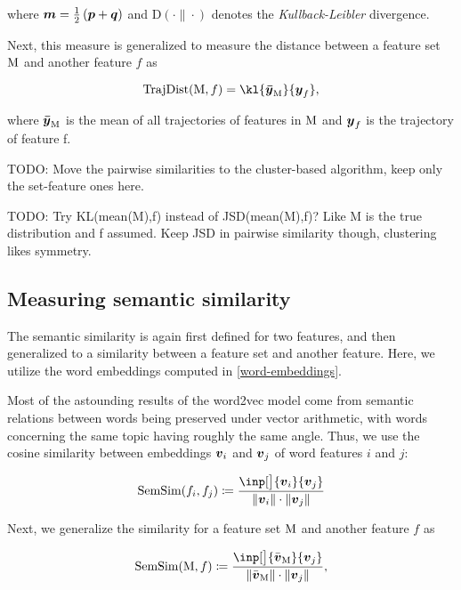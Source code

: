 where $\vect{m} = \frac{1}{2} \left( \vect{p} + \vect{q} \right)$ and $\text{D}( \cdot \| \cdot )$ denotes the \textit{Kullback-Leibler} divergence.

Next, this measure is generalized to measure the distance between a feature set $\text{M}$ and another feature $f$ as

\begin{equation}
	\trajdist( \featset, f ) = \kl{\vect{\bar{\traj}}_{\featset}}{\vect{\traj}_{f}},
\end{equation}

where $\vect{\bar{\traj}}_{\featset}$ is the mean of all trajectories of features in $\text{M}$ and $\vect{\traj}_{f}$ is the trajectory of feature f.

{\color{red} TODO: Move the pairwise similarities to the cluster-based algorithm, keep only the set-feature ones here.}

{\color{blue} TODO: Try KL(mean(M),f) instead of JSD(mean(M),f)? Like M is the true distribution and f assumed. Keep JSD in pairwise similarity though, clustering likes symmetry.}


\subsection{Measuring semantic similarity}

The semantic similarity is again first defined for two features, and then generalized to a similarity between a feature set and another feature. Here, we utilize the word embeddings computed in \ref{word-embeddings}.

Most of the astounding results of the word2vec model come from semantic relations between words being preserved under vector arithmetic, with words concerning the same topic having roughly the same angle. Thus, we use the cosine similarity between embeddings $\embed_{i}$ and $\embed_{j}$ of word features $i$ and $j$:

\begin{equation}
	\semsim( f_{i}, f_{j} ) \coloneqq \frac{\inp[\big]{\embed_{i}}{\embed_{j}}}{\| \embed_{i} \| \cdot \| \embed_{j} \|}
\end{equation}

Next, we generalize the similarity for a feature set $\text{M}$ and another feature $f$ as

\begin{equation}
	\semsim( \featset, f ) \coloneqq \frac{\inp[\big]{\bar{\embed}_{\featset}}{\embed_{j}}}{\| \bar{\embed}_{\featset} \| \cdot \| \embed_{j} \|},
\end{equation}

